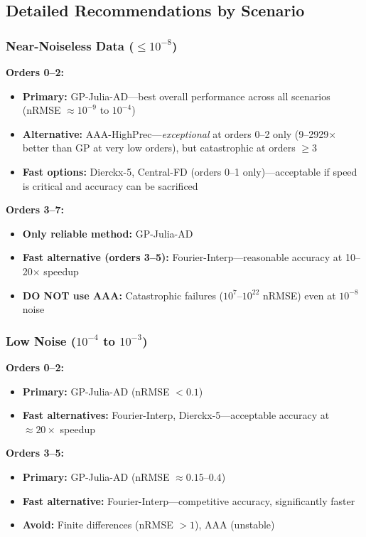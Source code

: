 \subsection{Detailed Recommendations by Scenario}

\subsubsection{Near-Noiseless Data ($\leq 10^{-8}$)}

\textbf{Orders 0--2:}
\begin{itemize}
    \item \textbf{Primary:} GP-Julia-AD—best overall performance across all scenarios (nRMSE $\approx 10^{-9}$ to $10^{-4}$)
    \item \textbf{Alternative:} AAA-HighPrec—\textit{exceptional} at orders 0--2 only (9--2929$\times$ better than GP at very low orders), but catastrophic at orders $\geq 3$
    \item \textbf{Fast options:} Dierckx-5, Central-FD (orders 0--1 only)—acceptable if speed is critical and accuracy can be sacrificed
\end{itemize}

\textbf{Orders 3--7:}
\begin{itemize}
    \item \textbf{Only reliable method:} GP-Julia-AD
    \item \textbf{Fast alternative (orders 3--5):} Fourier-Interp—reasonable accuracy at 10--20$\times$ speedup
    \item \textbf{DO NOT use AAA:} Catastrophic failures ($10^{7}$--$10^{22}$ nRMSE) even at $10^{-8}$ noise
\end{itemize}

\subsubsection{Low Noise ($10^{-4}$ to $10^{-3}$)}

\textbf{Orders 0--2:}
\begin{itemize}
    \item \textbf{Primary:} GP-Julia-AD (nRMSE $< 0.1$)
    \item \textbf{Fast alternatives:} Fourier-Interp, Dierckx-5—acceptable accuracy at $\approx 20\times$ speedup
\end{itemize}

\textbf{Orders 3--5:}
\begin{itemize}
    \item \textbf{Primary:} GP-Julia-AD (nRMSE $\approx 0.15$--$0.4$)
    \item \textbf{Fast alternative:} Fourier-Interp—competitive accuracy, significantly faster
    \item \textbf{Avoid:} Finite differences (nRMSE $> 1$), AAA (unstable)
\end{itemize}

